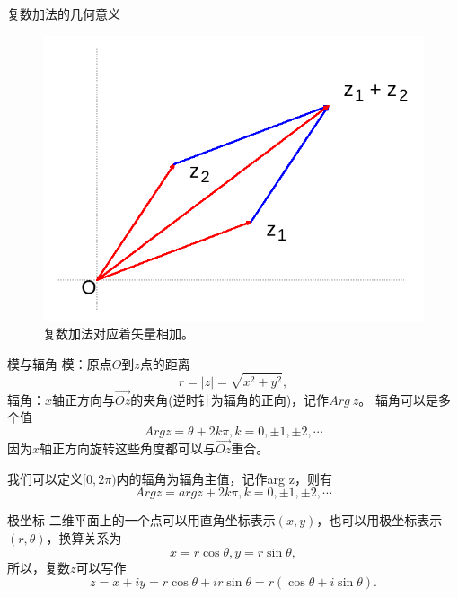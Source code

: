 \documentclass[11pt]{beamer}
\newcommand{\kong}[1][0.5]{\vspace{#1cm}}
\begin{document}
\begin{frame}{复数加法的几何意义}
\begin{figure}
	\centering
	\includegraphics[width=0.7\linewidth]{chap1_02}
	\caption{复数加法对应着矢量相加。}
	\label{fig:chap102}
\end{figure}

\end{frame}

\begin{frame}{模与辐角}
模：原点$O$到$z$点的距离
\begin{equation}
r = |z| = \sqrt{x^2 + y^2},
\end{equation}
辐角：$x$轴正方向与$\vec{Oz}$的夹角(逆时针为辐角的正向)，记作$Arg~z$。
辐角可以是多个值
\begin{equation}
Arg z = \theta + 2k \pi, k = 0, \pm 1, \pm 2, \cdots
\end{equation}
因为$x$轴正方向旋转这些角度都可以与$\vec{Oz}$重合。

\kong[0.5]

我们可以定义$[0,2\pi)$内的辐角为辐角主值，记作arg z，则有
\begin{equation}
Arg z = arg z + 2k\pi, k = 0, \pm 1, \pm 2, \cdots
\end{equation}
\end{frame}

\begin{frame}{极坐标}
二维平面上的一个点可以用直角坐标表示$(x,y)$，也可以用极坐标表示$(r,\theta)$，换算关系为
\begin{equation}
x = r \cos \theta, y = r \sin \theta,
\end{equation}
所以，复数$z$可以写作
\begin{equation}
z = x + iy = r\cos \theta + i r \sin \theta = r(\cos \theta + i \sin \theta).
\end{equation}
\end{frame}
\end{document}

